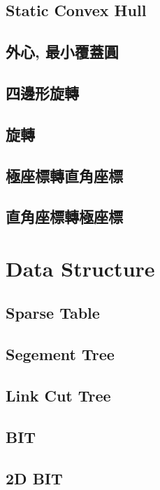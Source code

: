 \subsection{Static Convex Hull} 

\subsection{外心, 最小覆蓋圓} 

\subsection{四邊形旋轉} 

\subsection{旋轉} 

\subsection{極座標轉直角座標}

\subsection{直角座標轉極座標}


\section{Data Structure}
\subsection{Sparse Table}

\subsection{Segement Tree}

\subsection{Link Cut Tree}

\subsection{BIT}

\subsection{2D BIT}

